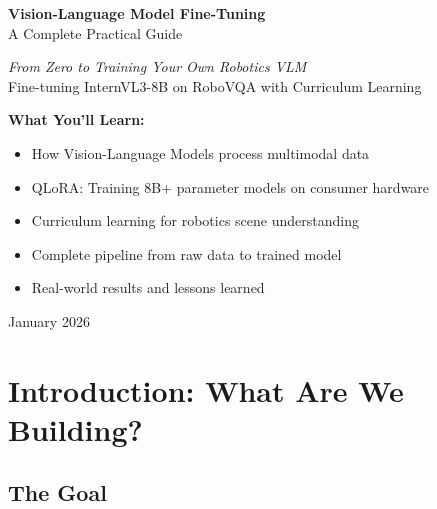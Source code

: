 \documentclass[11pt,a4paper]{article}
\begin{document}
\begin{titlepage}
    \centering
    \vspace*{2cm}
    
    {\Huge\bfseries Vision-Language Model Fine-Tuning\\[0.5cm]}
    {\LARGE A Complete Practical Guide\\[1cm]}
    
    \vspace{1cm}
    
    {\Large\itshape From Zero to Training Your Own Robotics VLM\\[0.5cm]}
    {\large Fine-tuning InternVL3-8B on RoboVQA with Curriculum Learning}
    
    \vspace{2cm}
    
    \begin{tcolorbox}[colback=backcolour,colframe=codegray,width=0.8\textwidth]
    \centering
    \textbf{What You'll Learn:}
    \begin{itemize}[leftmargin=*]
        \item How Vision-Language Models process multimodal data
        \item QLoRA: Training 8B+ parameter models on consumer hardware
        \item Curriculum learning for robotics scene understanding
        \item Complete pipeline from raw data to trained model
        \item Real-world results and lessons learned
    \end{itemize}
    \end{tcolorbox}
    
    \vfill
    
    {\large January 2026}
    
\end{titlepage}

\tableofcontents
\newpage

\section{Introduction: What Are We Building?}

\subsection{The Goal}
\end{document}
